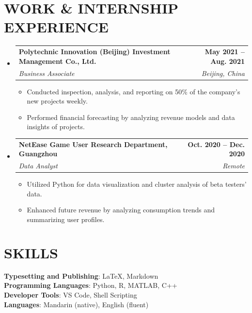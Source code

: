 \documentclass[letterpaper,11pt]{article}
\makeatletter
\newcommand{\resumeItem}[1]{
  \item\small{
    {#1 \vspace{-2pt}}
  }
}
\newcommand{\resumeSubheading}[4]{
  \vspace{-2pt}\item
    \begin{tabular*}{1.0\textwidth}[t]{l@{\extracolsep{\fill}}r}
      \textbf{#1} & \textbf{\small #2} \\
      \textit{\small#3} & \textit{\small #4} \\
    \end{tabular*}\vspace{-7pt}
}
\newcommand{\resumeSubHeadingListStart}{\begin{itemize}[leftmargin=0.0in, label={}]}
\newcommand{\resumeSubHeadingListEnd}{\end{itemize}}
\newcommand{\resumeItemListStart}{\begin{itemize}}
\newcommand{\resumeItemListEnd}{\end{itemize}\vspace{-5pt}}
\makeatother
\begin{document}
\section{WORK \& INTERNSHIP EXPERIENCE}
  \resumeSubHeadingListStart
      \resumeSubheading
      {Polytechnic Innovation (Beijing) Investment Management Co., Ltd.}{May 2021 -- Aug. 2021}
      {Business Associate}{Beijing, China}
      \resumeItemListStart
        \resumeItem{Conducted inspection, analysis, and reporting on 50\% of the company's new projects weekly.}
        \resumeItem{Performed financial forecasting by analyzing revenue models and data insights of projects.}
      \resumeItemListEnd

      \resumeSubheading
      {NetEase Game User Research Department, Guangzhou}{Oct. 2020 -- Dec. 2020}
      {Data Analyst}{Remote}
      \resumeItemListStart
        \resumeItem{Utilized Python for data visualization and cluster analysis of beta testers' data.}
        \resumeItem{Enhanced future revenue by analyzing consumption trends and summarizing user profiles.}
      \resumeItemListEnd
      
\resumeSubHeadingListEnd
\vspace{-16pt}






\section{SKILLS}
 \begin{itemize}[leftmargin=0.15in, label={}]
    \small{\item{
     \textbf{Typesetting and Publishing}{: LaTeX, Markdown} \\
     \textbf{Programming Languages}{: Python, R, MATLAB, C++} \\
     \textbf{Developer Tools}{: VS Code, Shell Scripting} \\
     \textbf{Languages}{: Mandarin (native), English (fluent)} \\
    }}
 \end{itemize}
\end{document}
